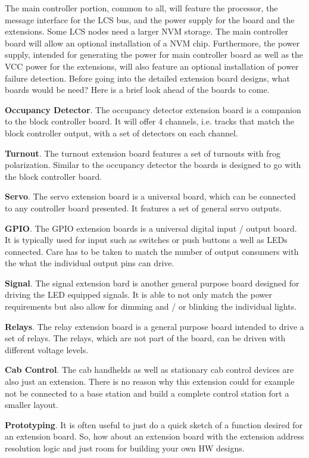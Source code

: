 The main controller portion, common to all, will feature the processor, the message interface for the LCS bus, and the power supply for the board and the extensions. Some LCS nodes need a larger NVM storage. The main controller board will allow an optional installation of a NVM chip. Furthermore, the power supply, intended for generating the power for main controller board as well as the VCC power for the extensions, will also feature an optional installation of power failure detection. Before going into the detailed extension board designs, what boards would be need? Here is a brief look ahead of the boards to come.
\begin{smallGapItemize}
\item \textbf{Occupancy Detector}. The occupancy detector extension board is a companion to the block controller board. It will offer 4 channels, i.e. tracks that match the block controller output, with a set of detectors on each channel.
\item \textbf{Turnout}. The turnout extension board features a set of turnouts with frog polarization. Similar to the occupancy detector the boards is designed to go with the block controller board.
\item \textbf{Servo}. The servo extension board is a universal board, which can be connected to any controller board presented. It features a set of general servo outputs.
\item \textbf{GPIO}. The GPIO extension boards is a universal digital input / output board. It is typically used for input such as switches or push buttons a well as LEDs connected. Care has to be taken to match the number of output consumers with the what the individual output pins can drive.
\item \textbf{Signal}. The signal extension bard is another general purpose board designed for driving the LED equipped signals. It is able to not only match the power requirements but also allow for dimming and / or blinking the individual lights.
\item \textbf{Relays}. The relay extension board is a general purpose board intended to drive a set of relays. The relays, which are not part of the board, can be driven with different voltage levels.
\item \textbf{Cab Control}. The cab handhelds as well as stationary cab control devices are also just an extension. There is no reason why this extension could for example not be connected to a base station and build a complete control station fort a smaller layout.
\item \textbf{Prototyping}. It is often useful to just do a quick sketch of a function desired for an extension board. So, how about an extension board with the extension address resolution logic and just room for building your own HW designs.
\end{smallGapItemize}

